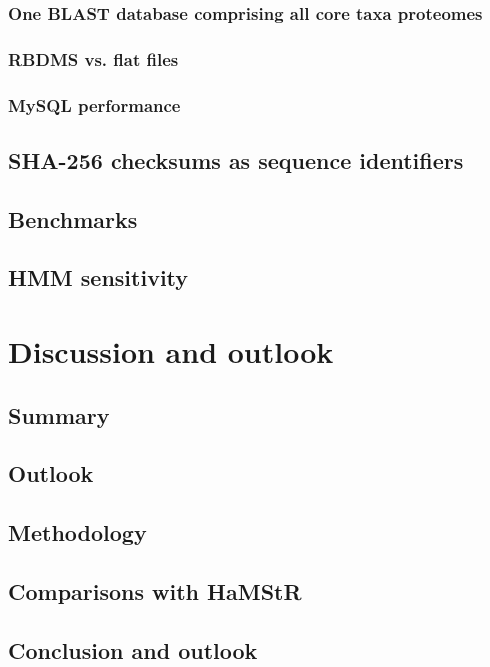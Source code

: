 \documentclass[a4paper,13pt]{scrreprt}
\newcommand{\hamstr}{HaMStR\xspace}
\begin{document}
		\subsection{One BLAST database comprising all core taxa proteomes}
			
		\subsection{RBDMS vs. flat files}
		\subsection{MySQL performance}
	\section{SHA-256 checksums as sequence identifiers}
		
	\section{Benchmarks}
	\section{HMM sensitivity}

\chapter{Discussion and outlook}
	\section{Summary}
	\section{Outlook}
\clearpage

\section{Methodology}
\clearpage

\section{Comparisons with \hamstr}
\clearpage

\section{Conclusion and outlook}
\clearpage
\end{document}
